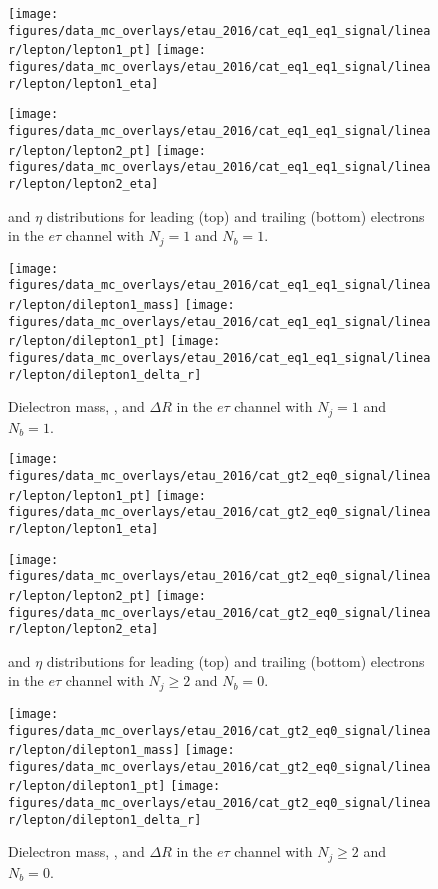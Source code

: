 \begin{figure}[htb!]
    \centering
    \texttt{[image: figures/data\_mc\_overlays/etau\_2016/cat\_eq1\_eq1\_signal/linear/lepton/lepton1\_pt]}
    \texttt{[image: figures/data\_mc\_overlays/etau\_2016/cat\_eq1\_eq1\_signal/linear/lepton/lepton1\_eta]}

    \texttt{[image: figures/data\_mc\_overlays/etau\_2016/cat\_eq1\_eq1\_signal/linear/lepton/lepton2\_pt]}
    \texttt{[image: figures/data\_mc\_overlays/etau\_2016/cat\_eq1\_eq1\_signal/linear/lepton/lepton2\_eta]}
    \caption{\pt and $\eta$ distributions for leading (top) and trailing
        (bottom) electrons in the $e\tau$ channel with $N_{j} = 1$ and
        $N_{b} = 1$.}
    \label{fig:etau_3_kinematic}
\end{figure}

\begin{figure}[htb!]
    \centering
    \texttt{[image: figures/data\_mc\_overlays/etau\_2016/cat\_eq1\_eq1\_signal/linear/lepton/dilepton1\_mass]}
    \texttt{[image: figures/data\_mc\_overlays/etau\_2016/cat\_eq1\_eq1\_signal/linear/lepton/dilepton1\_pt]}
    \texttt{[image: figures/data\_mc\_overlays/etau\_2016/cat\_eq1\_eq1\_signal/linear/lepton/dilepton1\_delta\_r]}
    \caption{Dielectron mass, \pt, and $\Delta R$ in the $e\tau$ channel
    with $N_{j} = 1$ and $N_{b} = 1$.}
    \label{fig:etau_3_dilepton}
\end{figure}

\begin{figure}[htb!]
    \centering
    \texttt{[image: figures/data\_mc\_overlays/etau\_2016/cat\_gt2\_eq0\_signal/linear/lepton/lepton1\_pt]}
    \texttt{[image: figures/data\_mc\_overlays/etau\_2016/cat\_gt2\_eq0\_signal/linear/lepton/lepton1\_eta]}

    \texttt{[image: figures/data\_mc\_overlays/etau\_2016/cat\_gt2\_eq0\_signal/linear/lepton/lepton2\_pt]}
    \texttt{[image: figures/data\_mc\_overlays/etau\_2016/cat\_gt2\_eq0\_signal/linear/lepton/lepton2\_eta]}
    \caption{\pt and $\eta$ distributions for leading (top) and trailing
        (bottom) electrons in the $e\tau$ channel with $N_{j} \geq 2$ and
        $N_{b} = 0$.}
    \label{fig:etau_4_kinematic}
\end{figure}

\begin{figure}[htb!]
    \centering
    \texttt{[image: figures/data\_mc\_overlays/etau\_2016/cat\_gt2\_eq0\_signal/linear/lepton/dilepton1\_mass]}
    \texttt{[image: figures/data\_mc\_overlays/etau\_2016/cat\_gt2\_eq0\_signal/linear/lepton/dilepton1\_pt]}
    \texttt{[image: figures/data\_mc\_overlays/etau\_2016/cat\_gt2\_eq0\_signal/linear/lepton/dilepton1\_delta\_r]}
    \caption{Dielectron mass, \pt, and $\Delta R$ in the $e\tau$ channel
    with $N_{j} \geq 2$ and $N_{b} = 0$.}
    \label{fig:etau_4_dilepton}
\end{figure}

